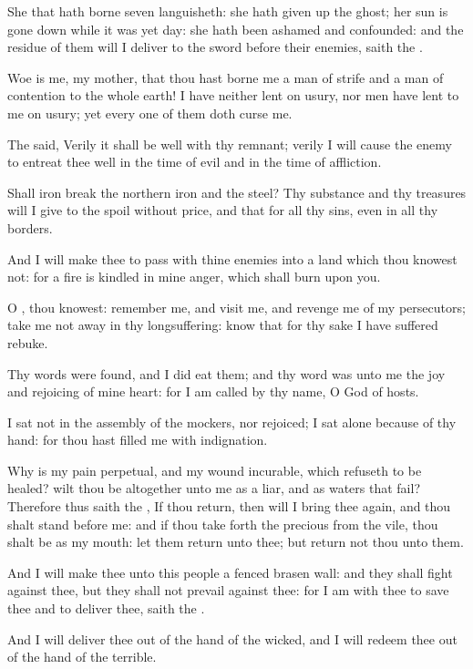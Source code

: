 \Verse She that hath borne seven languisheth: she hath given up the ghost; her sun is gone down while it was yet day: she hath been ashamed and confounded: and the residue of them will I deliver to the sword before their enemies, saith the \LORD.

\Verse Woe is me, my mother, that thou hast borne me a man of strife and a man of contention to the whole earth! I have neither lent on usury, nor men have lent to me on usury; yet every one of them doth curse me.

\Verse The \LORD said, Verily it shall be well with thy remnant; verily I will cause the enemy to entreat thee well in the time of evil and in the time of affliction.

\Verse Shall iron break the northern iron and the steel?  \Verse Thy substance and thy treasures will I give to the spoil without price, and that for all thy sins, even in all thy borders.

\Verse And I will make thee to pass with thine enemies into a land which thou knowest not: for a fire is kindled in mine anger, which shall burn upon you.

\Verse O \LORD, thou knowest: remember me, and visit me, and revenge me of my persecutors; take me not away in thy longsuffering: know that for thy sake I have suffered rebuke.

\Verse Thy words were found, and I did eat them; and thy word was unto me the joy and rejoicing of mine heart: for I am called by thy name, O \LORD God of hosts.

\Verse I sat not in the assembly of the mockers, nor rejoiced; I sat alone because of thy hand: for thou hast filled me with indignation.

\Verse Why is my pain perpetual, and my wound incurable, which refuseth to be healed? wilt thou be altogether unto me as a liar, and as waters that fail?  \Verse Therefore thus saith the \LORD, If thou return, then will I bring thee again, and thou shalt stand before me: and if thou take forth the precious from the vile, thou shalt be as my mouth: let them return unto thee; but return not thou unto them.

\Verse And I will make thee unto this people a fenced brasen wall: and they shall fight against thee, but they shall not prevail against thee: for I am with thee to save thee and to deliver thee, saith the \LORD.

\Verse And I will deliver thee out of the hand of the wicked, and I will redeem thee out of the hand of the terrible.



